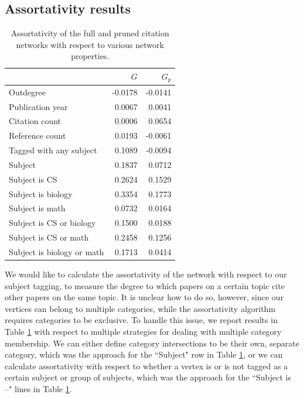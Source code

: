 \documentclass[12pt]{thesis}
\theoremstyle{plain}
\theoremstyle{definition}
\theoremstyle{remark}
\begin{document}
\subsection{Assortativity results}

\begin{table}[h]
\centering
\begin{tabular}{|l|r|r|}
\hline
 & $G$ & $G_p$ \\ \hline\hline
Outdegree & -0.0178 & -0.0141 \\ \hline
Publication year & 0.0067 & 0.0041 \\ \hline
Citation count & 0.0006 & 0.0654 \\ \hline
Reference count & 0.0193 & -0.0061 \\ \hline
Tagged with any subject & 0.1089 & -0.0094 \\ \hline
Subject & 0.1837 & 0.0712 \\ \hline
Subject is CS & 0.2624 & 0.1529 \\ \hline
Subject is biology & 0.3354 & 0.1773 \\ \hline
Subject is math & 0.0732 & 0.0164 \\ \hline
Subject is CS or biology & 0.1500 & 0.0188 \\ \hline
Subject is CS or math & 0.2458 & 0.1256 \\ \hline
Subject is biology or math & 0.1713 & 0.0414 \\ \hline
\end{tabular}
\caption{Assortativity of the full and pruned citation networks with respect to various network properties.}
\label{tab:assortativity}
\end{table}

We would like to calculate the assortativity of the network with respect to our subject tagging, to measure the degree to which papers on a certain topic cite other papers on the same topic. It is unclear how to do so, however, since our vertices can belong to multiple categories, while the assortativity algorithm requires categories to be exclusive. To handle this issue, we report results in Table \ref{tab:assortativity} with respect to multiple strategies for dealing with multiple category membership. We can either define category intersections to be their own, separate category, which was the approach for the ``Subject" row in Table \ref{tab:assortativity}, or we can calculate assortativity with respect to whether a vertex is or is not tagged as a certain subject or group of subjects, which was the approach for the ``Subject is --" lines in Table \ref{tab:assortativity}.
\end{document}
